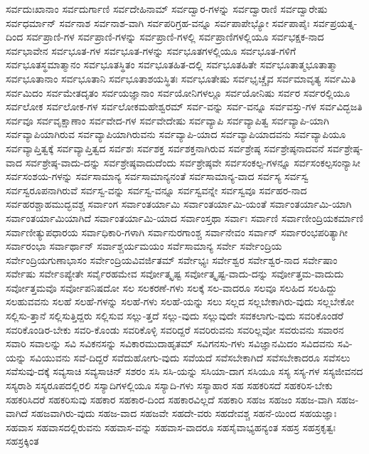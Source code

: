 {ಸರ್ವದುಃಖಾನಾಂ
ಸರ್ವದುರ್ಗಾಣಿ
ಸರ್ವದೇಹಿನಾಮ್
ಸರ್ವದ್ವಾರ-ಗಳನ್ನು
ಸರ್ವದ್ವಾರಾಣಿ
ಸರ್ವದ್ವಾರೇಷು
ಸರ್ವಧರ್ಮಾನ್
ಸರ್ವನಾಶ
ಸರ್ವನಾಶ-ವಾಗಿ
ಸರ್ವಪರಿಗ್ರಹ-ವನ್ನೂ
ಸರ್ವಪಾಪೇಭ್ಯೋ
ಸರ್ವಪಾಪೈಃ
ಸರ್ವಪ್ರಯತ್ನ-ದಿಂದ
ಸರ್ವಪ್ರಾಣಿ-ಗಳ
ಸರ್ವಪ್ರಾಣಿ-ಗಳನ್ನು
ಸರ್ವಪ್ರಾಣಿ-ಗಳಲ್ಲಿ
ಸರ್ವಪ್ರಾಣಿಗಳಲ್ಲಿಯೂ
ಸರ್ವಭಕ್ಷಕ-ನಾದ
ಸರ್ವಭಾವೇನ
ಸರ್ವಭೂತ-ಗಳ
ಸರ್ವಭೂತ-ಗಳನ್ನು
ಸರ್ವಭೂತಗಳಲ್ಲಿಯೂ
ಸರ್ವಭೂತ-ಗಳಿಗೆ
ಸರ್ವಭೂತಸ್ಥಮಾತ್ಮಾನಂ
ಸರ್ವಭೂತಸ್ಥಿತಂ
ಸರ್ವಭೂತಹಿತ-ದಲ್ಲಿ
ಸರ್ವಭೂತಹಿತೇ
ಸರ್ವಭೂತಾತ್ಮಭೂತಾತ್ಮಾ
ಸರ್ವಭೂತಾನಾಂ
ಸರ್ವಭೂತಾನಿ
ಸರ್ವಭೂತಾಶಯಸ್ಥಿತಃ
ಸರ್ವಭೂತೇಷು
ಸರ್ವಭೃಚ್ಚೈವ
ಸರ್ವಮಾವೃತ್ಯ
ಸರ್ವಮಿತಿ
ಸರ್ವಮಿದಂ
ಸರ್ವಮೇತದೃತಂ
ಸರ್ವಯಜ್ಞಾನಾಂ
ಸರ್ವಯೋನಿಗಳಲ್ಲೂ
ಸರ್ವಯೋನಿಷು
ಸರ್ವರ
ಸರ್ವರಲ್ಲಿಯೂ
ಸರ್ವಲೋಕ
ಸರ್ವಲೋಕ-ಗಳ
ಸರ್ವಲೋಕಮಹೇಶ್ವರಮ್
ಸರ್ವ-ವನ್ನು
ಸರ್ವ-ವನ್ನೂ
ಸರ್ವವಸ್ತು-ಗಳ
ಸರ್ವವಿದ್ಭಜತಿ
ಸರ್ವವೂ
ಸರ್ವವೃಕ್ಷಾಣಾಂ
ಸರ್ವವೇದ-ಗಳ
ಸರ್ವವೇದೇಷು
ಸರ್ವವ್ಯಾಪಿ
ಸರ್ವವ್ಯಾಪಿತ್ವ
ಸರ್ವವ್ಯಾಪಿ-ಯಾಗಿ
ಸರ್ವವ್ಯಾಪಿಯಾಗಿರುವ
ಸರ್ವವ್ಯಾಪಿಯಾಗಿರುವನು
ಸರ್ವವ್ಯಾಪಿ-ಯಾದ
ಸರ್ವವ್ಯಾಪಿಯಾದವನು
ಸರ್ವವ್ಯಾಪಿಯೂ
ಸರ್ವವ್ಯಾಪ್ತಿತ್ವಕ್ಕೆ
ಸರ್ವವ್ಯಾಪ್ತಿತ್ವದ
ಸರ್ವಶಃ
ಸರ್ವಶಕ್ತ
ಸರ್ವಶಕ್ತನಾಗಿರುವ
ಸರ್ವಶ್ರೇಷ್ಠ
ಸರ್ವಶ್ರೇಷ್ಠನಾದವನೆ
ಸರ್ವಶ್ರೇಷ್ಠ-ವಾದ
ಸರ್ವಶ್ರೇಷ್ಠ-ವಾದು-ದನ್ನು
ಸರ್ವಶ್ರೇಷ್ಠವಾದುದೆಂದು
ಸರ್ವಶ್ರೇಷ್ಠವೇ
ಸರ್ವಸಂಕಲ್ಪ-ಗಳನ್ನೂ
ಸರ್ವಸಂಕಲ್ಪಸಂನ್ಯಾಸೀ
ಸರ್ವಸಂಶಯ-ಗಳನ್ನು
ಸರ್ವಸಾಮಾನ್ಯ
ಸರ್ವಸಾಮಾನ್ಯನಂತೆ
ಸರ್ವಸಾಮಾನ್ಯ-ವಾದ
ಸರ್ವಸ್ಯ
ಸರ್ವಸ್ವ
ಸರ್ವಸ್ವರೂಪನಾಗಿರುವೆ
ಸರ್ವಸ್ವ-ವನ್ನು
ಸರ್ವಸ್ವ-ವನ್ನೂ
ಸರ್ವಸ್ವವನ್ನೇ
ಸರ್ವಸ್ವವೂ
ಸರ್ವಹರ-ನಾದ
ಸರ್ವಹರಶ್ಚಾಹಮುದ್ಭವಶ್ಚ
ಸರ್ವಾಂಗ
ಸರ್ವಾಂತರ್ಯಾಮಿ
ಸರ್ವಾಂತರ್ಯಾಮಿ-ಯಂತೆ
ಸರ್ವಾಂತರ್ಯಾಮಿ-ಯಾಗಿ
ಸರ್ವಾಂತರ್ಯಾಮಿಯಾಗಿದೆ
ಸರ್ವಾಂತರ್ಯಾಮಿ-ಯಾದ
ಸರ್ವಾಂಸ್ತಥಾ
ಸರ್ವಾಃ
ಸರ್ವಾಣಿ
ಸರ್ವಾಣೀಂದ್ರಿಯಕರ್ಮಾಣಿ
ಸರ್ವಾಣೀತ್ಯುಪಧಾರಯ
ಸರ್ವಾಧಿಕಾರಿ-ಗಳಾಗಿ
ಸರ್ವಾನುರಗಾಂಶ್ಚ
ಸರ್ವಾನೇವಂ
ಸರ್ವಾನ್
ಸರ್ವಾರಂಭಪರಿತ್ಯಾಗೀ
ಸರ್ವಾರಂಭಾ
ಸರ್ವಾರ್ಥಾನ್
ಸರ್ವಾಶ್ಚರ್ಯಮಯಂ
ಸರ್ವೆಸಾಮಾನ್ಯ
ಸರ್ವೇ
ಸರ್ವೇಂದ್ರಿಯ
ಸರ್ವೇಂದ್ರಿಯಗುಣಾಭಾಸಂ
ಸರ್ವೇಂದ್ರಿಯವಿವರ್ಜಿತಮ್
ಸರ್ವೇಭ್ಯಃ
ಸರ್ವೇಶ್ವರ
ಸರ್ವೇಶ್ವರ-ನಾದ
ಸರ್ವೇಷಾಂ
ಸರ್ವೇಷು
ಸರ್ವೇಽಪ್ಯೇತೇ
ಸರ್ವೈರಹಮೇವ
ಸರ್ವೋತ್ಕೃಷ್ಟ
ಸರ್ವೋತ್ಕೃಷ್ಟ-ವಾದು-ದನ್ನು
ಸರ್ವೋತ್ತಮ-ವಾದುದು
ಸರ್ವೋತ್ತಮವೊ
ಸರ್ವೋಪನಿಷದೋ
ಸಲ
ಸಲಕರಣೆ-ಗಳು
ಸಲಕ್ಕೆ
ಸಲ-ವಾದರೂ
ಸಲವೂ
ಸಲಹಿದ
ಸಲಹಿದ್ದು
ಸಲಹುವವನು
ಸಲಹೆ
ಸಲಹೆ-ಗಳನ್ನು
ಸಲಹೆ-ಗಳು
ಸಲಹೆ-ಯನ್ನು
ಸಲು
ಸಲ್ಲದ
ಸಲ್ಲಬೇಕಾಗಿರು-ವುದು
ಸಲ್ಲಬೇಕೋ
ಸಲ್ಲಿಸು-ತ್ತಾನೆ
ಸಲ್ಲಿಸುತ್ತಿದ್ದರು
ಸಲ್ಲಿಸುವ
ಸಲ್ಲು-ತ್ತದೆ
ಸಲ್ಲು-ವುದು
ಸಲ್ಲುವುದೇ
ಸವಕಲಾಗು-ವುದು
ಸವರಿಕೊಂಡರೆ
ಸವರಿಕೊಂಡಿರ-ಬೇಕು
ಸವರಿ-ಕೊಂಡು
ಸವರಿಕೊಳ್ಳಿ
ಸವರಿದ್ದರೆ
ಸವರಿರುವನು
ಸವರಿಲ್ಲವೋ
ಸವರುವನು
ಸವಾರನ
ಸವಾರಿ
ಸವಾಲನ್ನು
ಸವಿ
ಸವಿಕನಸನ್ನು
ಸವಿಕಾರಮುದಾಹೃತಮ್
ಸವಿಗನಸು-ಗಳು
ಸವಿಜ್ಞಾನಮಿದಂ
ಸವಿದವನು
ಸವಿ-ಯನ್ನು
ಸವಿಯುವನು
ಸವೆ-ದಿದ್ದರೆ
ಸವೆದುಹೋಗು-ವುದು
ಸವೆಯದೆ
ಸವೆಸಬೇಕಾಗಿದೆ
ಸವೆಸಬೇಕಾದರೂ
ಸವೆಸಲು
ಸವೆಸುವು-ದಕ್ಕೆ
ಸವ್ಯಸಾಚಿ
ಸವ್ಯಸಾಚಿನ್
ಸಶರಂ
ಸಸಿ
ಸಸಿ-ಯನ್ನು
ಸಸಿಯಾ-ದಾಗ
ಸಸಿಯೂ
ಸಸ್ಯ
ಸಸ್ಯ-ಗಳ
ಸಸ್ಯಜೀವನದ
ಸಸ್ಯರಾಶಿ
ಸಸ್ಯರೂಪದಲ್ಲಿರಲಿ
ಸಸ್ಯಾದಿಗಳಲ್ಲಿಯೂ
ಸಸ್ಯಾದಿ-ಗಳು
ಸಸ್ಯಾಹಾರ
ಸಹ
ಸಹಕರಿಸದೆ
ಸಹಕರಿಸ-ಬೇಕು
ಸಹಕರಿಸಿದರೆ
ಸಹಕರಿಸುವು
ಸಹಕಾರ
ಸಹಕಾರ-ದಿಂದ
ಸಹಕಾರವಿಲ್ಲದೆ
ಸಹಕಾರಿ
ಸಹಜ
ಸಹಜಂ
ಸಹಜ-ವಾಗಿ
ಸಹಜ-ವಾಗಿದೆ
ಸಹಜವಾಗಿರು-ವುದು
ಸಹಜ-ವಾದ
ಸಹಜವೇ
ಸಹದೇ-ವರು
ಸಹದೇವಶ್ಚ
ಸಹನೆ-ಯಿಂದ
ಸಹಯಜ್ಞಾಃ
ಸಹವಾಸ
ಸಹವಾಸದಲ್ಲಿರುವನು
ಸಹವಾಸ-ವನ್ನು
ಸಹವಾಸ-ವಾದರೂ
ಸಹಸೈವಾಭ್ಯಹನ್ಯಂತ
ಸಹಸ್ರ
ಸಹಸ್ರಕೃತ್ವಃ
ಸಹಸ್ರಕ್ಕಿಂತ
}
